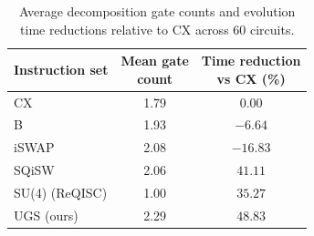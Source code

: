 \begin{table}[!htbp]\centering
\begingroup\small
\caption{Average decomposition gate counts and evolution time reductions relative to CX across 60 circuits.}\label{tab:2}
\vspace{2pt}
\setlength{\tabcolsep}{3pt}\renewcommand{\arraystretch}{1.15}
\begin{tabular}{lcc}\toprule
Instruction set & \shortstack{Mean gate\\count} & \shortstack{Time reduction\\vs CX (\%)} \\
\midrule
CX & 1.79 & $0.00$ \\
B & 1.93 & $-6.64$ \\
iSWAP & 2.08 & $-16.83$ \\
SQiSW & 2.06 & $41.11$ \\
SU(4) (ReQISC) & 1.00 & $35.27$ \\
UGS (ours) & 2.29 & $48.83$ \\
\bottomrule\end{tabular}
\endgroup\end{table}
